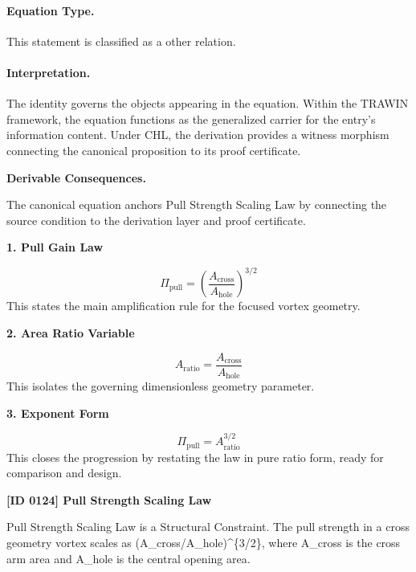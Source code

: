\paragraph{Equation Type.}
This statement is classified as a other relation.

\paragraph{Interpretation.}
The identity governs the objects appearing in the equation. Within the TRAWIN framework, the equation functions as the generalized carrier for the entry’s information content. Under CHL, the derivation provides a witness morphism connecting the canonical proposition to its proof certificate.

\par\vspace{0.35em}
\noindent\textbf{Derivable Consequences.}\quad
\begingroup
\footnotesize
\raggedright
The canonical equation anchors Pull Strength Scaling Law by connecting the source condition to the derivation layer and proof certificate.
\par\endgroup

\noindent\textbf{1. Pull Gain Law}\par
\[
\Pi_{\mathrm{pull}} = \left(\frac{A_{\mathrm{cross}}}{A_{\mathrm{hole}}}\right)^{3/2}
\]
\noindent This states the main amplification rule for the focused vortex geometry.\par
\noindent\textbf{2. Area Ratio Variable}\par
\[
A_{\mathrm{ratio}} = \frac{A_{\mathrm{cross}}}{A_{\mathrm{hole}}}
\]
\noindent This isolates the governing dimensionless geometry parameter.\par
\noindent\textbf{3. Exponent Form}\par
\[
\Pi_{\mathrm{pull}} = A_{\mathrm{ratio}}^{3/2}
\]
\noindent This closes the progression by restating the law in pure ratio form, ready for comparison and design.\par

\clearpage
\noindent\textbf{[ID 0124] Pull Strength Scaling Law}\par
\vspace{0.35em}
\begingroup\small
{}
Pull Strength Scaling Law is a Structural Constraint. The pull strength in a cross geometry vortex scales as (A\_cross/A\_hole)\textasciicircum{}\{3/2\}, where A\_cross is the cross arm area and A\_hole is the central opening area.

